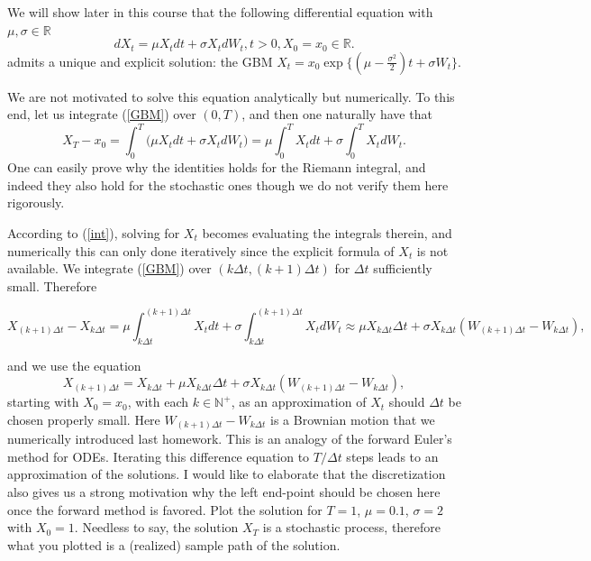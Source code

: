     \problem
    \begin{question}
        We will show later in this course that the following differential equation
        with $\mu,\sigma\in\mathbb R$
        \begin{equation}\label{GBM}
        dX_t=\mu X_tdt+\sigma X_tdW_t, t>0, X_0=x_0\in\mathbb R.
        \end{equation}
        admits a unique and explicit solution: the GBM
        $X_t=x_0\exp\{(\mu-\frac{\sigma^2}{2})t+\sigma W_t\}$.

        We are not motivated to solve this equation analytically but numerically.
        To this end, let us integrate (\ref{GBM}) over $(0,T)$, and then
        one naturally have that
        \begin{equation}\label{int}
        X_T-x_0=\int_0^T\Big(\mu X_tdt+\sigma X_tdW_t\Big)=\mu \int_0^TX_tdt+\sigma  \int_0^T X_tdW_t.
        \end{equation}
        One can easily prove why the identities holds for the Riemann integral,
        and indeed they also hold for the stochastic ones though we do not verify
        them here rigorously.

        According to (\ref{int}), solving for $X_t$ becomes evaluating the integrals
        therein, and numerically this can only done iteratively since the explicit
        formula of $X_t$ is not available.  We integrate (\ref{GBM}) over
        $(k\Delta t,(k+1)\Delta t)$ for $\Delta t$ sufficiently small.  Therefore
        \begin{fullwidth}
        \[X_{(k+1)\Delta t}-X_{k\Delta t}=\mu \int_{k\Delta t}^{(k+1)\Delta t}X_tdt
        +\sigma  \int_{k\Delta t}^{(k+1)\Delta t} X_tdW_t\approx \mu X_{k\Delta t}\Delta t
        +\sigma X_{k\Delta t}(W_{(k+1)\Delta t}-W_{k\Delta t}),\]
        \end{fullwidth}
        and we use the equation
        \[X_{(k+1)\Delta t}= X_{k\Delta t}+\mu X_{k\Delta t}\Delta t
        +\sigma X_{k\Delta t}(W_{(k+1)\Delta t}-W_{k\Delta t}),\]
        starting with $X_0=x_0$, with each $k\in\mathbb N^+$, as an approximation
        of $X_t$ should $\Delta t$ be chosen properly small.
        Here $W_{(k+1)\Delta t}-W_{k\Delta t}$ is a Brownian motion that we numerically
        introduced last homework.  This is an analogy of the forward Euler's method for ODEs.
        Iterating this difference equation to $T/\Delta t$ steps leads to an approximation
        of the solutions.  I would like to elaborate that the discretization also gives us
        a strong motivation why the left end-point should be chosen here once the forward
        method is favored.  Plot the solution for $T=1$, $\mu=0.1$, $\sigma=2$ with $X_0=1$.
        Needless to say, the solution $X_T$ is a stochastic process, therefore what
        you plotted is a (realized) sample path of the solution.
    \end{question}
